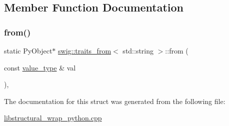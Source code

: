 \subsection{Member Function Documentation}
\mbox{\label{structswig_1_1traits__from_3_01std_1_1string_01_4_af6e0987239b6f657facf1fc5fcbddea6}} 
\subsubsection{\texorpdfstring{from()}{from()}}
{\footnotesize\ttfamily static Py\+Object$\ast$ \hyperlink{structswig_1_1traits__from}{swig\+::traits\+\_\+from}$<$ std\+::string $>$\+::from (\begin{DoxyParamCaption}\item[{const \hyperlink{structswig_1_1traits__from_3_01std_1_1string_01_4_a873f8111e50ab64c5f0711f3fc8479ad}{value\+\_\+type} \&}]{val }\end{DoxyParamCaption})\hspace{0.3cm}{\ttfamily [inline]}, {\ttfamily [static]}}



The documentation for this struct was generated from the following file\+:\begin{DoxyCompactItemize}
\item 
\hyperlink{libstructural__wrap__python_8cpp}{libstructural\+\_\+wrap\+\_\+python.\+cpp}\end{DoxyCompactItemize}
